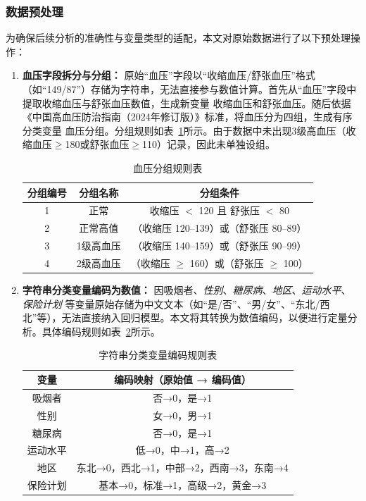 \documentclass[a4paper]{ctexart}
\begin{document}
\subsubsection{数据预处理}

为确保后续分析的准确性与变量类型的适配，本文对原始数据进行了以下预处理操作：

\begin{enumerate}[(1)]
\item \textbf{血压字段拆分与分组：}
原始“血压”字段以“收缩血压/舒张血压”格式（如“149/87”）存储为字符串，无法直接参与数值计算。首先从“血压”字段中提取收缩血压与舒张血压数值，生成新变量 收缩血压和舒张血压。随后依据《中国高血压防治指南（2024年修订版）》标准，将血压分为四组，生成有序分类变量 血压分组。分组规则如表~\ref{tab:bp_group}所示。由于数据中未出现3级高血压（收缩血压$\geq$180或舒张血压$\geq$110）记录，因此未单独设组。

\begin{table}[H]
\centering
\caption{血压分组规则表}
\label{tab:bp_group}
\begin{tabular}{c c c}
\toprule
分组编号 & 分组名称 & 分组条件 \\
\midrule
1 & 正常 & 收缩压 $<$ 120 且 舒张压 $<$ 80 \\
2 & 正常高值 & （收缩压 120–139）或（舒张压 80–89） \\
3 & 1级高血压 & （收缩压 140–159）或（舒张压 90–99） \\
4 & 2级高血压 & （收缩压 $\geq$ 160）或（舒张压 $\geq$ 100） \\
\bottomrule
\end{tabular}
\end{table}

\item \textbf{字符串分类变量编码为数值：}
因吸烟者、\textit{性别}、\textit{糖尿病}、\textit{地区}、\textit{运动水平}、\textit{保险计划} 等变量原始存储为中文文本（如“是/否”、“男/女”、“东北/西北”等），无法直接纳入回归模型。本文将其转换为数值编码，以便进行定量分析。具体编码规则如表~\ref{tab:encode}所示。

\begin{table}[H]
\centering
\caption{字符串分类变量编码规则表}
\label{tab:encode}
\begin{tabular}{c c}
\toprule
变量 & 编码映射（原始值 → 编码值） \\
\midrule
吸烟者 & 否→0，是→1 \\
性别 & 女→0，男→1 \\
糖尿病 & 否→0，是→1 \\
运动水平 & 低→0，中→1，高→2 \\
地区 & 东北→0，西北→1，中部→2，西南→3，东南→4 \\
保险计划 & 基本→0，标准→1，高级→2，黄金→3 \\
\bottomrule
\end{tabular}
\end{table}


\end{enumerate}
\end{document}
